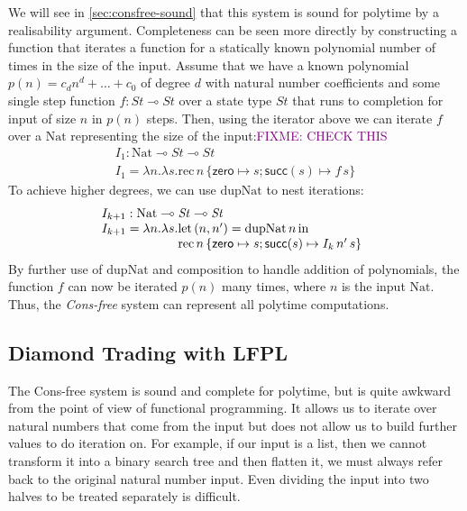 \documentclass[acmsmall,screen]{acmart}
\newcommand{\tmRec}{\mathrm{rec}}
\newcommand{\tyNat}{\mathrm{Nat}}
\newcommand{\conZero}{\mathsf{zero}}
\newcommand{\conSucc}{\mathsf{succ}}
\newcommand{\Let}{\mathrm{let}}
\newcommand{\In}{\mathrm{in}}
\newcommand{\dupNat}{\mathrm{dupNat}}
\newcommand{\bob}[1]{\textcolor{purple}{FIXME: #1}}
\begin{document}
We will see in \autoref{sec:consfree-sound} that this system is sound
for polytime by a realisability argument. Completeness can be seen
more directly by constructing a function that iterates a function for
a statically known polynomial number of times in the size of the
input. Assume that we have a known polynomial
$p(n) = c_dn^d + \dots + c_0$ of degree $d$ with natural number
coefficients and some single step function
$f : \mathit{St} \multimap \mathit{St}$ over a state type
$\mathit{St}$ that runs to completion for input of size $n$ in $p(n)$
steps. Then, using the iterator above we can iterate $f$ over a
$\tyNat$ representing the size of the input:\bob{CHECK THIS}
\begin{displaymath}
  \begin{array}{l}
    I_1 : \tyNat \multimap \mathit{St} \multimap \mathit{St} \\
    I_1 = \lambda n. \lambda s.\tmRec\,n\,\{\conZero \mapsto s; \conSucc(s) \mapsto f\,s \}
  \end{array}
\end{displaymath}
To achieve higher degrees, we can use $\dupNat$ to nest iterations:
\begin{displaymath}
  \begin{array}{l}
    I_{k+1} : \tyNat \multimap \mathit{St} \multimap \mathit{St} \\
    I_{k+1} = \lambda n. \lambda s.
    \begin{array}[t]{@{}l}
      \Let\,(n,n') = \dupNat\,n\,\In\\
      \tmRec\,n\,\{\conZero \mapsto s; \conSucc(s) \mapsto I_k\,n'\,s \}
    \end{array}
  \end{array}
\end{displaymath}
By further use of $\dupNat$ and composition to handle addition of
polynomials, the function $f$ can now be iterated $p(n)$ many times,
where $n$ is the input $\tyNat$. Thus, the \emph{Cons-free} system can
represent all polytime computations.

\subsection{Diamond Trading with LFPL}
\label{sec:lfpl-intro}

The Cons-free system is sound and complete for polytime, but is quite
awkward from the point of view of functional programming. It allows us
to iterate over natural numbers that come from the input but does not
allow us to build further values to do iteration on. For example, if
our input is a list, then we cannot transform it into a binary search
tree and then flatten it, we must always refer back to the original
natural number input. Even dividing the input into two halves to be
treated separately is difficult.
\end{document}

